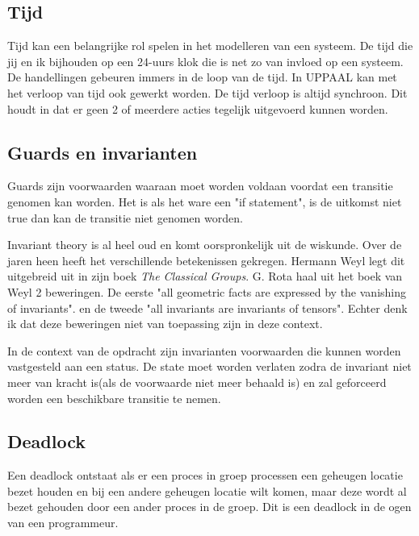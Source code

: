 \documentclass{article}%
\begin{document}




\subsection{Tijd}
Tijd kan een belangrijke rol spelen in het modelleren van een systeem. De tijd die jij en ik bijhouden op een 24-uurs klok die is net zo van invloed op een systeem. De handellingen gebeuren immers in de loop van de tijd.
In UPPAAL kan met het verloop van tijd ook gewerkt worden. De tijd verloop is altijd synchroon. Dit houdt in dat er geen 2 of meerdere acties tegelijk uitgevoerd kunnen worden.







\subsection{Guards en invarianten}
Guards zijn voorwaarden waaraan moet worden voldaan voordat een transitie genomen kan worden. Het is als het ware een "if statement", is de uitkomst niet true dan kan de transitie niet genomen worden.

Invariant theory is al heel oud en komt oorspronkelijk uit de wiskunde. Over de jaren heen heeft het verschillende betekenissen gekregen. Hermann Weyl legt dit uitgebreid uit in zijn boek \textit{The Classical Groups}. \cite{classicalgroups} G. Rota haal uit het boek van Weyl 2 beweringen. De eerste "all geometric facts are expressed by the vanishing of invariants". en de tweede "all invariants are invariants of tensors". Echter denk ik dat deze beweringen niet van toepassing zijn in deze context.

In de context van de opdracht zijn invarianten voorwaarden die kunnen worden vastgesteld aan een status. De state moet worden verlaten zodra de invariant niet meer van kracht is(als de voorwaarde niet meer behaald is) en zal geforceerd worden een beschikbare transitie te nemen.

\subsection{Deadlock}
Een deadlock ontstaat als er een proces in groep processen een geheugen locatie bezet houden en bij een andere geheugen locatie wilt komen, maar deze wordt al bezet gehouden door een ander proces in de groep. Dit is een deadlock in de ogen van een programmeur.\cite{deadlockproblem}
\end{document}
